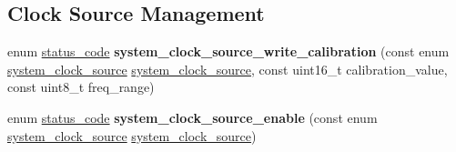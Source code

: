 \subsection*{Clock Source Management}
\begin{DoxyCompactItemize}
\item 
\hypertarget{group__asfdoc__sam0__system__clock__group_ga9b801cecbdb70ee5eec6e556dc659997}{}enum \hyperlink{group__group__sam0__utils__status__codes_ga751c892e5a46b8e7d282085a5a5bf151}{status\+\_\+code} {\bfseries system\+\_\+clock\+\_\+source\+\_\+write\+\_\+calibration} (const enum \hyperlink{group__asfdoc__sam0__system__clock__group_ga86882dc960f2552722e9713da97fcc58}{system\+\_\+clock\+\_\+source} \hyperlink{group__asfdoc__sam0__system__clock__group_ga86882dc960f2552722e9713da97fcc58}{system\+\_\+clock\+\_\+source}, const uint16\+\_\+t calibration\+\_\+value, const uint8\+\_\+t freq\+\_\+range)\label{group__asfdoc__sam0__system__clock__group_ga9b801cecbdb70ee5eec6e556dc659997}

\item 
\hypertarget{group__asfdoc__sam0__system__clock__group_gad1e70dd9d08ec72e6a1cbef848ff8189}{}enum \hyperlink{group__group__sam0__utils__status__codes_ga751c892e5a46b8e7d282085a5a5bf151}{status\+\_\+code} {\bfseries system\+\_\+clock\+\_\+source\+\_\+enable} (const enum \hyperlink{group__asfdoc__sam0__system__clock__group_ga86882dc960f2552722e9713da97fcc58}{system\+\_\+clock\+\_\+source} \hyperlink{group__asfdoc__sam0__system__clock__group_ga86882dc960f2552722e9713da97fcc58}{system\+\_\+clock\+\_\+source})\label{group__asfdoc__sam0__system__clock__group_gad1e70dd9d08ec72e6a1cbef848ff8189}


\end{DoxyCompactItemize}
